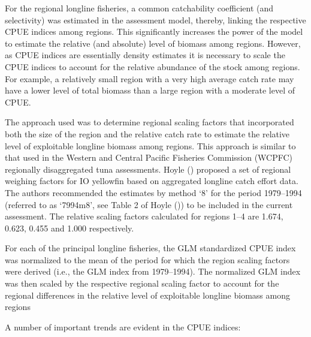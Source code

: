 \documentclass[
]{scrartcl}
\begin{document}
For the regional longline fisheries, a common catchability coefficient
(and selectivity) was estimated in the assessment model, thereby,
linking the respective CPUE indices among regions. This significantly
increases the power of the model to estimate the relative (and absolute)
level of biomass among regions. However, as CPUE indices are essentially
density estimates it is necessary to scale the CPUE indices to account
for the relative abundance of the stock among regions. For example, a
relatively small region with a very high average catch rate may have a
lower level of total biomass than a large region with a moderate level
of CPUE.

The approach used was to determine regional scaling factors that
incorporated both the size of the region and the relative catch rate to
estimate the relative level of exploitable longline biomass among
regions. This approach is similar to that used in the Western and
Central Pacific Fisheries Commission (WCPFC) regionally disaggregated
tuna assessments. Hoyle
() proposed a set of
regional weighing factors for IO yellowfin based on aggregated longline
catch effort data. The authors recommended the estimates by method `8'
for the period 1979--1994 (referred to as `7994m8', see Table 2 of Hoyle
()) to be included in
the current assessment. The relative scaling factors calculated for
regions 1--4 are 1.674, 0.623, 0.455 and 1.000 respectively.

For each of the principal longline fisheries, the GLM standardized CPUE
index was normalized to the mean of the period for which the region
scaling factors were derived (i.e., the GLM index from 1979--1994). The
normalized GLM index was then scaled by the respective regional scaling
factor to account for the regional differences in the relative level of
exploitable longline biomass among regions

A number of important trends are evident in the CPUE indices:
\end{document}
